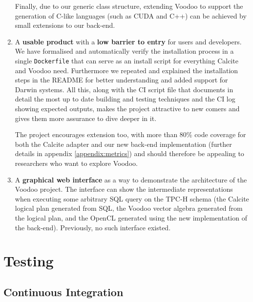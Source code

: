 \begin{enumerate}
    Finally, due to our generic class structure, extending Voodoo to support the generation of C-like languages (such as CUDA and C++) can be achieved by small extensions to our back-end.
    
    \item A \textbf{usable product} with a \textbf{low barrier to entry} for users and developers. We have formalised and automatically verify the installation process in a single \texttt{Dockerfile} that can serve as an install script for everything Calcite and Voodoo need. Furthermore we repeated and explained the installation steps in the README for better understanding and added support for Darwin systems. All this, along with the CI script file that documents in detail the most up to date building and testing techniques and the CI log showing expected outputs, makes the project attractive to new comers and gives them more assurance to dive deeper in it. 
    
    The project encourages extension too, with more than 80\% code coverage for both the Calcite adapter and our new back-end implementation (further details in appendix \ref{appendix:metrics}) and should therefore be appealing to researchers who want to explore Voodoo.
    
    \item A \textbf{graphical web interface} as a way to demonstrate the architecture of the Voodoo project. The interface can show the intermediate representations when executing some arbitrary SQL query on the TPC-H schema (the Calcite logical plan generated from SQL, the Voodoo vector algebra generated from the logical plan, and the OpenCL generated using the new implementation of the back-end). Previously, no such interface existed.
\end{enumerate}

\section{Testing}

\subsection{Continuous Integration}\label{sub:ci-testing}


